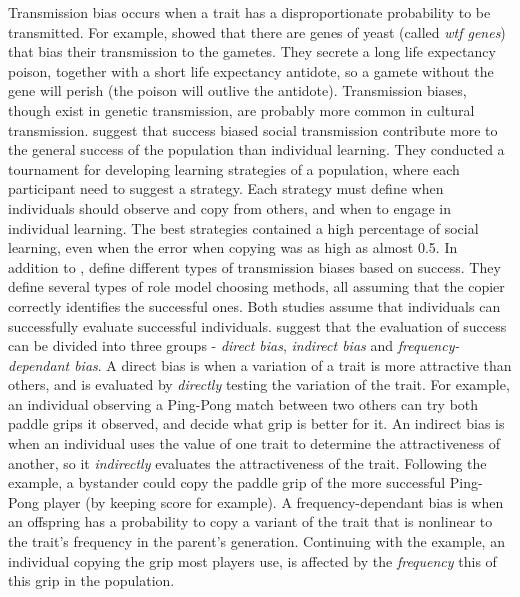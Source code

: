 \documentclass[11pt]{article}
\begin{document}
Transmission bias occurs when a trait has a disproportionate probability to be transmitted.  %
For example, \citet{wtfGene} showed that there are genes of yeast (called \textit{wtf genes}) that bias their transmission to the gametes. %
They secrete a long life expectancy poison, together with a short life expectancy antidote, so a gamete without the gene will perish (the poison will outlive the antidote). %
Transmission biases, though exist in genetic transmission, are probably more common in cultural transmission. %
 \citet{strategiesPaper} suggest that success biased social transmission contribute more to the general success of the population than individual learning. %
 They conducted a tournament for developing learning strategies of a population, where each participant need to suggest a strategy. %
 Each strategy must define when individuals should observe and copy from others, and when to engage in individual learning. %
 The best strategies contained a high percentage of social learning, even when the error when copying was as high as almost 0.5. %
In addition to \citet{strategiesPaper}, \citet{complexityPaper} define different types of transmission biases based on success. %
They define several types of role model choosing methods, all assuming that the copier correctly identifies the successful ones. %
Both studies assume that individuals can successfully evaluate successful individuals.
\citet[Ch. 5]{evolutionBook} suggest that the evaluation of success can be divided into three groups - \textit{direct bias}, \textit{indirect bias} and \textit{frequency-dependant bias}. %
A direct bias is when a variation of a trait is more attractive than others, and is evaluated by \textit{directly} testing the variation of the trait. %
For example, an individual observing a Ping-Pong match between two others can try both paddle grips it observed, and decide what grip is better for it. %
An indirect bias is when an individual uses the value of one trait to determine the attractiveness of another, so it \textit{indirectly} evaluates the attractiveness of the trait. %
Following the example, a bystander could copy the paddle grip of the more successful Ping-Pong player (by keeping score for example). %
A frequency-dependant bias is when an offspring has a probability to copy a variant of the trait that is nonlinear to the trait's frequency in the parent's generation. %
Continuing with the example, an individual copying the grip most players use, is affected by the \textit{frequency} this of this grip in the population.\\ %
 
\end{document}

